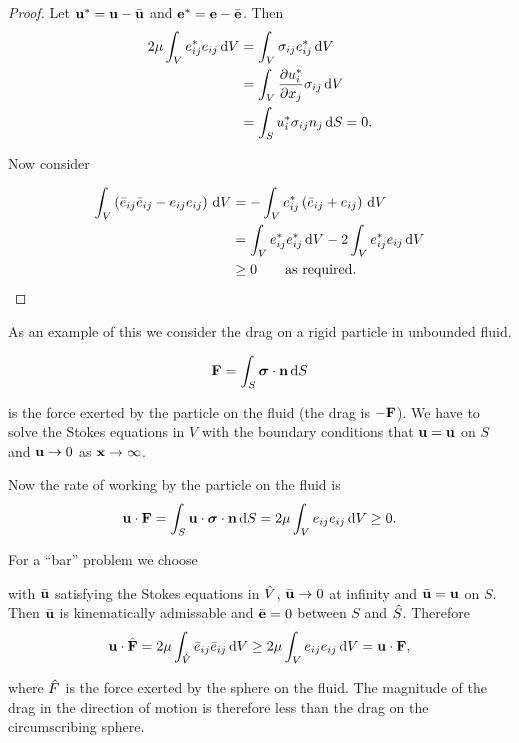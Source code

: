 \documentclass{notes}
\newcommand{\bs}{\boldsymbol{\sigma}}
\newcommand{\e}{\mathbf{e}}
\theoremstyle{plain}
\begin{document}
\begin{proof}
Let $\mathbf{u}^\ast = \mathbf{u} - \Bar{\mathbf{u}}$ and $\e^\ast = \e - \Bar{\e}$.
Then
\begin{align*}
2 \mu \int_V e^\ast_{i j} e_{i j}\, \mathrm{d} V &=
\int_V \sigma_{i j} e^\ast_{i j}\, \mathrm{d} V \\
&= \int_V \frac{\partial u_i^\ast}{\partial x_j} \sigma_{i j}\, \mathrm{d} V \\
&= \int_S u^\ast_i \sigma_{i j} n_j\, \mathrm{d} S = 0.
\end{align*}

Now consider

\begin{align*}
\int_V \left( \Bar{e}_{i j} \Bar{e}_{i j} - e_{i j} e_{i j} \right)\, \mathrm{d} V
&= - \int_V e^\ast_{ij} \left( \Bar{e}_{i j} + e_{i j} \right)\, \mathrm{d} V \\
&= \int_V e^\ast_{i j} e^\ast_{i j}\, \mathrm{d} V
- 2 \int_V e^\ast_{i j} e_{i j}\, \mathrm{d} V \\
& \ge 0 \qquad \text{as required.}
\end{align*}
\end{proof}

As an example of this we consider the drag on a rigid particle in
unbounded fluid.

\vspace{1in}

\[
\vF = \int_S \bs \cdot \vn\, \ud S
\]

is the force exerted by the particle on the fluid (the drag is
$-\mathbf{F}$).  We have to solve the Stokes equations in $V$ with the
boundary conditions that $\mathbf{u} = \mathbf{u}$ on $S$ and $\mathbf{u} \to 0$ as
$\mathbf{x} \to \infty$.

Now the rate of working by the particle on the fluid is
\[
\vu \cdot \vF = \int_S \vu \cdot \bs\cdot \vn\, \ud S
= 2 \mu \int_V e_{i j} e_{i j}\, \ud V \ge 0.
\]

For a ``bar'' problem we choose

\vspace{1in}

with $\Bar{\mathbf{u}}$ satisfying the Stokes equations in $\Hat{V}$,
$\Bar{\mathbf{u}} \to 0$ at infinity and $\Bar{\mathbf{u}} = \mathbf{u}$ on $S$.
Then $\Bar{\mathbf{u}}$ is kinematically admissable and $\Bar{\e} = 0$ between
$S$ and $\Hat{S}$.  Therefore
\[
\mathbf{u} \cdot \Hat{\mathbf{F}} = 2 \mu \int_{\Hat{V}} \Bar{e}_{i j}
\Bar{e}_{i j}\, \mathrm{d} V
\ge 2 \mu \int_V e_{i j} e_{i j}\, \mathrm{d} V =\mathbf{u} \cdot \mathbf{F},
\]

where $\Hat{F}$ is the force exerted by the sphere on the fluid.  The
magnitude of the drag in the direction of motion is therefore less than the
drag on the circumscribing sphere.
\end{document}
